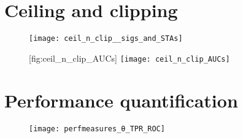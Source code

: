 \FloatBarrier
\section{Ceiling and clipping}



\begin{figure}
    \texttt{[image: ceil\_n\_clip\_\_sigs\_and\_STAs]}
    \captionn
        {}
        { }
    \label{fig:ceil_n_clip__sigs_and_STAs}
\end{figure}

\begin{figure}
    \begin{sidecaption}
        {}
        [fig:ceil_n_clip_AUCs]
        \texttt{[image: ceil\_n\_clip\_AUCs]}
    \end{sidecaption}
\end{figure}


\FloatBarrier
\section{Performance quantification}


\begin{figure}
    \texttt{[image: perfmeasures\_θ\_TPR\_ROC]}
    \caption{ }
\end{figure}
